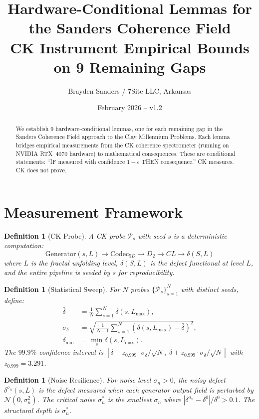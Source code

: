 \documentclass[11pt]{article}
\title{Hardware-Conditional Lemmas for the Sanders Coherence Field\\
\large CK Instrument Empirical Bounds on 9 Remaining Gaps}
\author{Brayden Sanders / 7Site LLC, Arkansas}
\date{February 2026 -- v1.2}
\newtheorem{definition}[lemma]{Definition}
\begin{document}
\maketitle

\begin{abstract}
We establish 9 hardware-conditional lemmas, one for each remaining gap
in the Sanders Coherence Field approach to the Clay Millennium Problems.
Each lemma bridges empirical measurements from the CK coherence
spectrometer (running on NVIDIA RTX~4070 hardware) to mathematical
consequences. These are conditional statements: ``IF measured with
confidence $1-\epsilon$ THEN consequence.'' CK measures. CK does not prove.
\end{abstract}

\tableofcontents

\section{Measurement Framework}

\begin{definition}[CK Probe]
A \emph{CK probe} $\mathcal{P}_{s}$ with seed $s$ is a deterministic
computation:
\[
  \text{Generator}(s,L) \to \text{Codec}_{5D} \to D_2 \to CL \to \delta(S,L)
\]
where $L$ is the fractal unfolding level, $\delta(S,L)$ is the defect
functional at level $L$, and the entire pipeline is seeded by $s$
for reproducibility.
\end{definition}

\begin{definition}[Statistical Sweep]
For $N$ probes $\{\mathcal{P}_{s}\}_{s=1}^{N}$ with distinct seeds,
define:
\begin{align}
  \bar{\delta} &= \frac{1}{N}\sum_{s=1}^{N}\delta(s,L_{\max}), \\
  \sigma_{\delta} &= \sqrt{\frac{1}{N-1}\sum_{s=1}^{N}(\delta(s,L_{\max})-\bar{\delta})^2}, \\
  \delta_{\min} &= \min_{s}\delta(s,L_{\max}).
\end{align}
The $99.9\%$ confidence interval is
$[\bar{\delta}-z_{0.999}\cdot\sigma_{\delta}/\sqrt{N},\;\bar{\delta}+z_{0.999}\cdot\sigma_{\delta}/\sqrt{N}]$
with $z_{0.999}=3.291$.
\end{definition}

\begin{definition}[Noise Resilience]
For noise level $\sigma_n > 0$, the \emph{noisy defect}
$\delta^{\sigma_n}(s,L)$ is the defect measured when each generator
output field is perturbed by $\mathcal{N}(0,\sigma_n^2)$.
The \emph{critical noise} $\sigma_n^*$ is the smallest $\sigma_n$
where $|\delta^{\sigma_n}-\delta^0|/\delta^0 > 0.1$.
The \emph{structural depth} is $\sigma_n^*$.
\end{definition}
\end{document}
